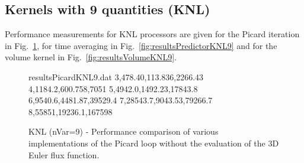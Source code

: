 \documentclass{acm_proc_article-sp}
\begin{document}
\subsection{Kernels with 9 quantities (KNL)} \label{sec:app2}

Performance measurements for KNL processors are given for the Picard iteration in Fig.~\ref{fig:resultsPicardKNL9}, for time averaging in Fig.~\ref{fig:resultsPredictorKNL9} and for the volume kernel in Fig.~\ref{fig:resultsVolumeKNL9}.

\begin{figure}[H]
\begin{filecontents}{resultsPicardKNL9.dat}
3,478.40,113.836,2266.43
4,1184.2,600.758,7051
5,4942.0,1492.23,17843.8
6,9540.6,4481.87,39529.4
7,28543.7,9043.53,79266.7
8,55851,19236.1,167598
\end{filecontents}
\pgfplotsset{scaled y ticks=false}
\caption{KNL (nVar=9) - Performance comparison of various implementations of the Picard loop without the evaluation of the 3D Euler flux function.}\label{fig:resultsPicardKNL9}
\end{figure}
\end{document}
